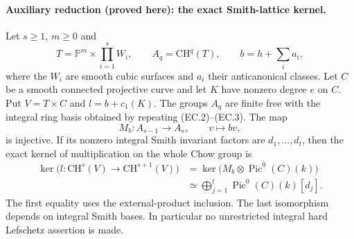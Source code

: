 \paragraph{Auxiliary reduction (proved here): the exact Smith-lattice kernel.}
Let $s\ge1$, $m\ge0$ and
\[
 T=\mathbb P^m\times\prod_{i=1}^sW_i,
 \qquad A_q=\mathrm{CH}^q(T),\qquad
 b=h+\sum_i a_i,
\]
where the $W_i$ are smooth cubic surfaces and $a_i$ their
anticanonical classes. Let $C$ be a smooth connected projective
curve and let $K$ have nonzero degree $e$ on $C$. Put
$V=T\times C$ and $l=b+c_1(K)$.
The groups $A_q$ are finite free with the integral ring basis
obtained by repeating (EC.2)--(EC.3). The map
\[
 M_b:A_{s-1}\longrightarrow A_s,\qquad v\longmapsto bv,
 \tag{EC.7}
\]
is injective. If its nonzero integral Smith invariant factors are
$d_1,\ldots,d_t$, then the exact kernel of multiplication on the
whole Chow group is
\[
 \begin{split}
 \ker\bigl(l:\mathrm{CH}^{s}(V)\longrightarrow
                         \mathrm{CH}^{s+1}(V)\bigr)
  &=\ker\bigl(M_b\otimes\operatorname{Pic}^0(C)(k)\bigr)\\
  &\simeq\bigoplus_{j=1}^t\operatorname{Pic}^0(C)(k)[d_j].
 \end{split}
 \tag{EC.8}
\]
The first equality uses the external-product inclusion. The last
isomorphism depends on integral Smith bases. In particular no
unrestricted integral hard Lefschetz assertion is made.

